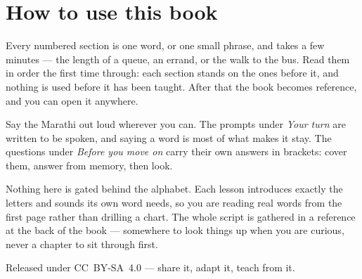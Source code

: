 \documentclass[11pt,twoside]{book}
\begin{document}
\section*{How to use this book}

Every numbered section is one word, or one small phrase, and takes a few
minutes --- the length of a queue, an errand, or the walk to the bus. Read them
in order the first time through: each section stands on the ones before it, and
nothing is used before it has been taught. After that the book becomes
reference, and you can open it anywhere.

Say the Marathi out loud wherever you can. The prompts under \emph{Your turn}
are written to be spoken, and saying a word is most of what makes it stay. The
questions under \emph{Before you move on} carry their own answers in brackets:
cover them, answer from memory, then look.

Nothing here is gated behind the alphabet. Each lesson introduces exactly the
letters and sounds its own word needs, so you are reading real words from the
first page rather than drilling a chart. The whole script is gathered in a
reference at the back of the book --- somewhere to look things up when you are
curious, never a chapter to sit through first.

Released under CC~BY-SA~4.0 --- share it, adapt it, teach from it.

\tableofcontents

\mainmatter


\end{document}

